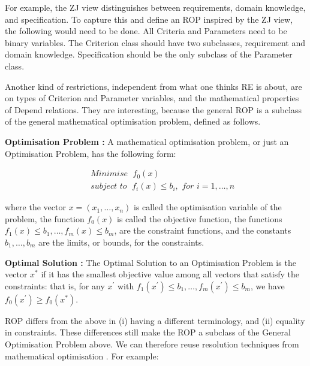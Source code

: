\documentclass[graybox]{svmult}
\newcommand{\zi}[1]{\textit{#1}}
\newcommand{\xb}[1]{\textbf{#1}}
\newcommand{\RE}{RE}
\newcommand{\ZJ}{ZJ}
\newcommand{\Criterion}{Criterion}
\newcommand{\Criteria}{Criteria}
\newcommand{\Parameter}{Parameter}
\newcommand{\Depend}{Depend}
\newcommand{\ROP}{ROP}
\begin{document}
For example, the \ZJ{} view distinguishes between requirements, domain knowledge, and specification. To capture this and define an \ROP{} inspired by the \ZJ{} view, the following would need to be done. All \Criteria{} and \Parameter s need to be binary variables. The \Criterion{} class should have two subclasses, requirement and domain knowledge. Specification should be the only subclass of the \Parameter{} class.

Another kind of restrictions, independent from what one thinks \RE{} is about, are on types of \Criterion{} and \Parameter{} variables, and the mathematical properties of \Depend{} relations. They are interesting, because the general \ROP{} is a subclass of the general mathematical optimisation problem, defined as follows.

\begin{definition}\label{d:general-optimisation=problem}
\xb{Optimisation Problem \cite{boyd2004convex}:} A mathematical optimisation problem, or just an Optimisation Problem, has the following form:

\begin{eqnarray*}
& & \zi{Minimise }\; f_{0}(x) \\
& & \zi{subject to }\; f_{i}(x) \leq b_{i}, \zi{ for } i = 1, \ldots, n
\end{eqnarray*}

where the vector $x = (x_{1}, \ldots, x_{n})$ is called the optimisation variable of the problem, the function $f_{0}(x)$ is called the objective function, the functions $f_{1}(x) \leq b_{1}, \ldots, f_{m}(x) \leq b_{m}$, are the constraint functions, and the constants $b_{1}, \ldots, b_{m}$ are the limits, or bounds, for the constraints.
\end{definition}

\begin{definition}\label{d:general-optimal-solution}
\xb{Optimal Solution :} The Optimal Solution to an Optimisation Problem is the vector $x^{\ast}$ if it has the smallest objective value among all vectors that satisfy the constraints: that is, for any $x^{\prime}$ with $f_{1}(x^{\prime}) \leq b_{1}, \ldots, f_{m}(x^{\prime}) \leq b_{m}$, we have $f_{0}(x^{\prime}) \geq f_{0}(x^{\ast})$.
\end{definition}

\ROP{} differs from the above in (i) having a different terminology, and (ii) equality in constraints. These differences still make the \ROP{} a subclass of the General Optimisation Problem above. We can therefore reuse resolution techniques from mathematical optimisation \cite{bradley1977applied, boyd2004convex, krentel1988complexity, papadimitriou1991optimization, yannakakis1991expressing, junger201050}. For example:
\end{document}
